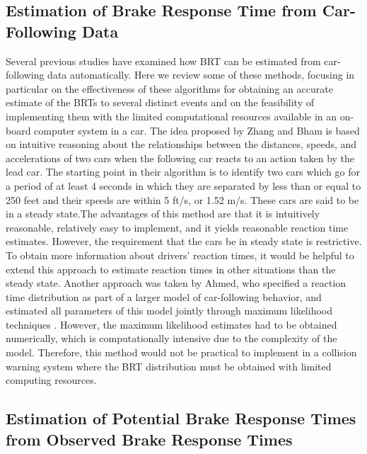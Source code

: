 \documentclass[conference]{IEEEtran}
\begin{document}
\subsection{Estimation of Brake Response Time from Car-Following Data}
\label{litrev:BRTEst}
Several previous studies have examined how BRT can be estimated from car-following data automatically.  Here we review some of these methods, focusing in particular on the effectiveness of these algorithms for obtaining an accurate estimate of the BRTs to several distinct events and on the feasibility of implementing them with the limited computational resources available in an on-board computer system in a car.
The idea proposed by Zhang and Bham \cite{ZhangBham:EstDriverRT} is based on intuitive reasoning about the relationships between the distances, speeds, and accelerations of two cars when the following car reacts to an action taken by the lead car.  The starting point in their algorithm is to identify two cars which go for a period of at least 4 seconds in which they are separated by less than or equal to 250 feet and their speeds are within 5 ft/s, or 1.52 m/s.  These cars are said to be in a steady state.The advantages of this method are that it is intuitively reasonable, relatively easy to implement, and it yields reasonable reaction time estimates.  However, the requirement that the cars be in steady state is restrictive.
To obtain more information about drivers' reaction times, it would be helpful to extend this approach to estimate reaction times in other situations than the steady state.
Another approach was taken by Ahmed, who specified a reaction time distribution as part of a larger model of car-following behavior, and estimated all parameters of this model jointly through maximum likelihood techniques \cite{Ahmed:ModelingDrivers}.
However, the maximum likelihood estimates had to be obtained numerically, which is computationally intensive due to the complexity of the model.  Therefore, this method would not be practical to implement in a collision warning system where the BRT distribution must be obtained with limited computing resources.

\subsection{Estimation of Potential Brake Response Times from Observed Brake Response Times}
\label{litrev:PRTEst}
\end{document}
